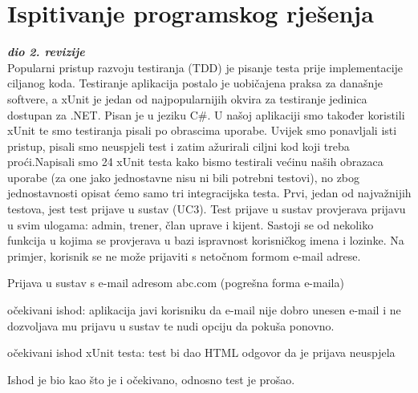 			
			\eject 
		
	
		\section{Ispitivanje programskog rješenja}
			
			\textbf{\textit{dio 2. revizije}}\\
			
			 \textnormal{Popularni pristup razvoju testiranja (TDD) je pisanje testa prije implementacije ciljanog koda.  	Testiranje aplikacija postalo je uobičajena praksa za današnje softvere, a xUnit je jedan od najpopularnijih okvira za testiranje jedinica dostupan za .NET. Pisan je u jeziku C\#. U našoj aplikaciji smo također koristili xUnit te smo testiranja pisali po obrascima uporabe. Uvijek smo ponavljali isti pristup, pisali smo neuspjeli test i zatim ažurirali ciljni kod koji treba proći.Napisali smo 24 xUnit testa kako bismo testirali većinu naših obrazaca uporabe (za one jako jednostavne nisu ni bili potrebni testovi), no zbog jednostavnosti opisat ćemo samo tri integracijska testa.}
			 \bigbreak
			 \textnormal {	Prvi, jedan od najvažnijih testova, jest test prijave u sustav (UC3). Test prijave u sustav provjerava prijavu u svim ulogama: admin, trener, član uprave i kijent. Sastoji se od nekoliko funkcija u kojima se provjerava u bazi ispravnost korisničkog imena i lozinke. Na primjer, korisnik se ne može prijaviti s netočnom formom e-mail adrese. }
			 	\begin{packed_item}
			 	
			 	\item Prijava u sustav s e-mail adresom abc.com (pogrešna forma e-maila)
			 	\item[] \begin{packed_enum}
			 		\item očekivani ishod: aplikacija javi korisniku da e-mail nije dobro unesen e-mail i ne dozvoljava mu prijavu u sustav te nudi opciju da pokuša ponovno.
			 		\item očekivani ishod xUnit testa: test bi dao HTML odgovor da je prijava neuspjela
			 	\end{packed_enum}
			 \end{packed_item}
		 \textnormal {Ishod je bio kao što je i očekivano, odnosno test je prošao.}
		 
